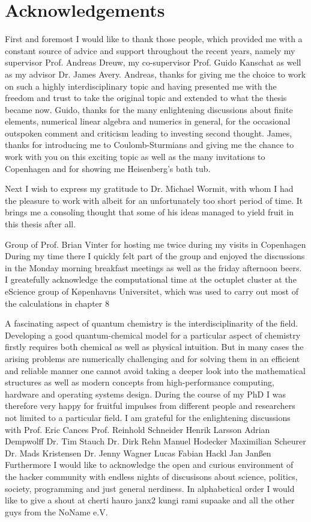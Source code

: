 \chapter*{Acknowledgements}

First and foremost I would like to thank those people,
which provided me with a constant source of advice and support
throughout the recent years,
namely my supervisor Prof. Andreas Dreuw,
my co-supervisor Prof. Guido Kanschat
as well as my advisor Dr. James Avery.
Andreas, thanks for giving me the choice to work on such
a highly interdisciplinary topic
and having presented me with the freedom and trust
to take the original topic and extended to what the thesis became now.
Guido, thanks for the many enlightening discussions
about finite elements,
numerical linear algebra and numerics in general,
for the occasional outspoken comment and criticism
leading to investing second thought.
James, thanks for introducing me to Coulomb-Sturmians
and giving me the chance to work with you on this
exciting topic
as well as the many invitations to Copenhagen
and for showing me Heisenberg's bath tub.

Next I wish to express my gratitude to Dr. Michael Wormit,
with whom I had the pleasure to work with
albeit for an unfortunately too short period of time.
It brings me a consoling thought that some of his
ideas managed to yield fruit in this thesis after all.

Group of Prof. Brian Vinter for hosting me twice
during my visits in Copenhagen
During my time there I quickly felt part of the group
and enjoyed the discussions in the Monday morning breakfast meetings
as well as the friday afternoon beers.
I greatefully acknowledge the computational time at the octuplet cluster at
the eScience group of Køpenhavns Universitet, which was used to carry out
most of the calculations in chapter 8

A fascinating aspect of quantum chemistry is the interdisciplinarity of the field.
Developing a good quantum-chemical model for a particular aspect of chemistry
firstly requires both chemical as well as physical intuition.
But in many cases the arising problems are numerically challenging
and for solving them in an efficient and reliable manner
one cannot avoid taking a deeper look into the mathematical structures
as well as modern concepts from high-performance computing,
hardware and operating systems design.
During the course of my PhD I was therefore very
happy for fruitful impulses from different people and researchers
not limited to a particular field.
I am grateful for the enlightening discussions with
Prof. Eric Cances
Prof. Reinhold Schneider
Henrik Larsson
Adrian Dempwolff
Dr. Tim Stauch
Dr. Dirk Rehn
Manuel Hodecker
Maximilian Scheurer
Dr. Mads Kristensen
Dr. Jenny Wagner
Lucas Fabian Hackl
Jan Janßen
Furthermore I would like to acknowledge the open and curious
environment of the hacker community with endless nights
of discusisons about science, politics,
society, programming and just general nerdiness.
In alphabetical order I would like to give a shout at 
cherti
hauro
janx2
kungi
rami
supaake
and all the other guys from the NoName e.V.

